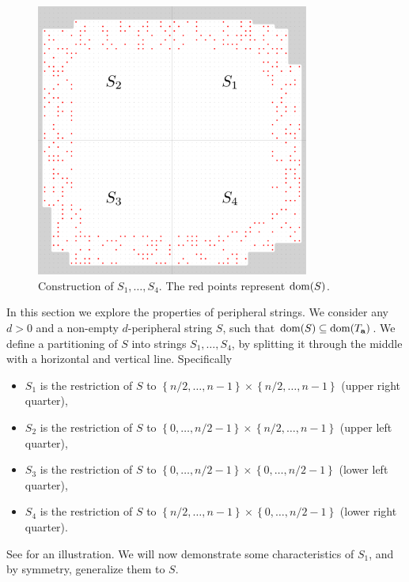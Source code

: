 \documentclass[11pt, letterpaper]{article}
\theoremstyle{plain}
\theoremstyle{definition}
\theoremstyle{remark}
\newcommand{\set}[1]{\left\lbrace #1 \right\rbrace}
\begin{document}
\begin{figure}[!t]
	\begin{center}
		\includegraphics[width=0.8\textwidth]{drawings/quarter_split}
	\end{center}
	\caption{Construction of $S_1, \dots, S_4$. The red points represent $\operatorname*{dom}(S)$.}
	\label{figure:quarter_split}
\end{figure}
In this section we explore the properties of peripheral strings.
We consider any $d > 0$ and a non-empty $d$-peripheral string $S$, such that $\operatorname*{dom}(S) \subseteq \operatorname*{dom}(T_\mathbf{a})$.
We define a partitioning of $S$ into strings $S_1, \dots, S_4$, by splitting it through the middle with a horizontal and vertical line. 
Specifically
\begin{itemize}
	\item $S_1$ is the restriction of $S$ to $\set{n / 2, \dots, n - 1} \times \set{n / 2, \dots, n - 1}$ (upper right quarter),
	\item $S_2$ is the restriction of $S$ to $\set{0, \dots, n / 2 - 1} \times \set{n / 2, \dots, n - 1}$ (upper left quarter),
	\item $S_3$ is the restriction of $S$ to $\set{0, \dots, n / 2 - 1} \times \set{0, \dots, n / 2 - 1}$ (lower left quarter),
	\item $S_4$ is the restriction of $S$ to $\set{n / 2, \dots, n - 1} \times \set{0, \dots, n / 2 - 1}$ (lower right quarter).
\end{itemize}
See  for an illustration.
We will now demonstrate some characteristics of $S_1$, and by symmetry, generalize them to $S$.
\end{document}
